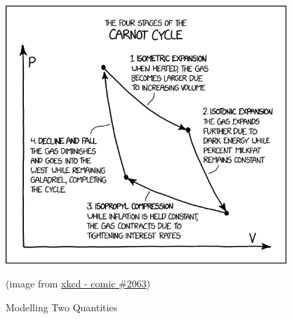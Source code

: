 %
%


\begin{topic}



\vfil

\begin{center}
\begin{minipage}{300pt}
	\includegraphics*[width=300pt]{images/chap3-xkcd.png}

	\hfill {\footnotesize (image from \href{https://www.xkcd.com/2063/}{xkcd - comic \#2063})}
\end{minipage}
\end{center}


\end{topic}






%
%



\begin{module}{Modelling Two Quantities}
	\label{sys:model}

	
	
\end{module}



